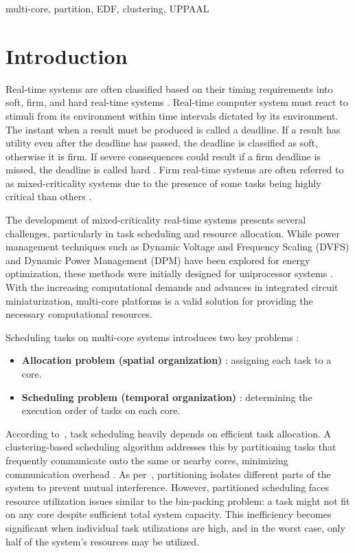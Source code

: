 \documentclass[conference]{IEEEtran}
\begin{document}
\begin{IEEEkeywords}
multi-core, partition, EDF, clustering, UPPAAL
\end{IEEEkeywords}

\section{Introduction}
Real-time systems are often classified based on their timing requirements into soft, firm, and hard real-time systems \cite{6122386}.  Real-time computer system must react to stimuli from its environment within time intervals dictated by its environment. The instant when a result must be produced is called a deadline. If a result has utility even after the deadline has passed, the deadline is classified as soft, otherwise it is firm. If severe consequences could result if a firm deadline is missed, the deadline is called hard \cite{kopetzDist}. Firm real-time systems are often referred to as mixed-criticality systems due to the presence of some tasks being highly critical than others \cite{zamora2013}.

The development of mixed-criticality real-time systems presents several challenges, particularly in task scheduling and resource allocation. While power management techniques such as Dynamic Voltage and Frequency Scaling (DVFS) and Dynamic Power Management (DPM) have been explored for energy optimization, these methods were initially designed for uniprocessor systems \cite{6122386}. With the increasing computational demands and advances in integrated circuit miniaturization, multi-core platforms is a valid solution for providing the necessary computational resources.

Scheduling tasks on multi-core systems introduces two key problems \cite{AbdallahGB24}:
\begin{itemize}
    \item \textbf{Allocation problem (spatial organization)} : assigning each task to a core.
    \item \textbf{Scheduling problem (temporal organization)} : determining the execution order of tasks on each core.
\end{itemize}

According to~\cite{7832222}, task scheduling heavily depends on efficient task allocation. A clustering-based scheduling algorithm addresses this by partitioning tasks that frequently communicate onto the same or nearby cores, minimizing communication overhead \cite{AbdallahGB24}. As per~\cite{zamora2013}, partitioning isolates different parts of the system to prevent mutual interference. However, partitioned scheduling faces resource utilization issues similar to the bin-packing problem: a task might not fit on any core despite sufficient total system capacity. This inefficiency becomes significant when individual task utilizations are high, and in the worst case, only half of the system’s resources may be utilized.
\end{document}
